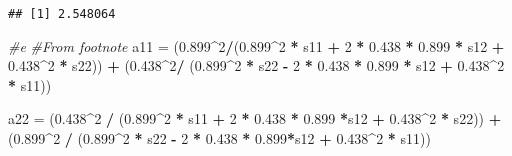 \documentclass[
]{article}
\newenvironment{Shaded}{\begin{snugshade}}{\end{snugshade}}
\newcommand{\CommentTok}[1]{\textcolor[rgb]{0.56,0.35,0.01}{\textit{#1}}}
\newcommand{\DecValTok}[1]{\textcolor[rgb]{0.00,0.00,0.81}{#1}}
\newcommand{\FloatTok}[1]{\textcolor[rgb]{0.00,0.00,0.81}{#1}}
\newcommand{\NormalTok}[1]{#1}
\newcommand{\OperatorTok}[1]{\textcolor[rgb]{0.81,0.36,0.00}{\textbf{#1}}}
\newcommand{\StringTok}[1]{\textcolor[rgb]{0.31,0.60,0.02}{#1}}
\begin{document}
\begin{verbatim}
## [1] 2.548064
\end{verbatim}

\begin{Shaded}
\begin{Highlighting}[]
\CommentTok{#e}
\CommentTok{#From footnote}
\NormalTok{a11 =}\StringTok{ }\NormalTok{(}\FloatTok{0.899}\OperatorTok{^}\DecValTok{2}\OperatorTok{/}\NormalTok{(}\FloatTok{0.899}\OperatorTok{^}\DecValTok{2} \OperatorTok{*}\StringTok{ }\NormalTok{s11 }\OperatorTok{+}\StringTok{ }\DecValTok{2} \OperatorTok{*}\StringTok{ }\FloatTok{0.438} \OperatorTok{*}\StringTok{ }\FloatTok{0.899} \OperatorTok{*}\StringTok{ }\NormalTok{s12 }\OperatorTok{+}\StringTok{ }\FloatTok{0.438}\OperatorTok{^}\DecValTok{2} \OperatorTok{*}\StringTok{ }\NormalTok{s22)) }\OperatorTok{+}\StringTok{ }\NormalTok{(}\FloatTok{0.438}\OperatorTok{^}\DecValTok{2}\OperatorTok{/}\StringTok{ }\NormalTok{(}\FloatTok{0.899}\OperatorTok{^}\DecValTok{2} \OperatorTok{*}\StringTok{ }\NormalTok{s22 }\OperatorTok{-}\StringTok{ }\DecValTok{2} \OperatorTok{*}\StringTok{ }\FloatTok{0.438} \OperatorTok{*}\StringTok{ }\FloatTok{0.899} \OperatorTok{*}\StringTok{ }\NormalTok{s12 }\OperatorTok{+}\StringTok{ }\FloatTok{0.438}\OperatorTok{^}\DecValTok{2} \OperatorTok{*}\StringTok{ }\NormalTok{s11))}

\NormalTok{a22 =}\StringTok{ }\NormalTok{(}\FloatTok{0.438}\OperatorTok{^}\DecValTok{2} \OperatorTok{/}\StringTok{ }\NormalTok{(}\FloatTok{0.899}\OperatorTok{^}\DecValTok{2} \OperatorTok{*}\StringTok{ }\NormalTok{s11 }\OperatorTok{+}\StringTok{ }\DecValTok{2} \OperatorTok{*}\StringTok{ }\FloatTok{0.438} \OperatorTok{*}\StringTok{ }\FloatTok{0.899} \OperatorTok{*}\NormalTok{s12 }\OperatorTok{+}\StringTok{ }\FloatTok{0.438}\OperatorTok{^}\DecValTok{2} \OperatorTok{*}\StringTok{ }\NormalTok{s22)) }\OperatorTok{+}\StringTok{ }\NormalTok{(}\FloatTok{0.899}\OperatorTok{^}\DecValTok{2} \OperatorTok{/}\StringTok{ }\NormalTok{(}\FloatTok{0.899}\OperatorTok{^}\DecValTok{2} \OperatorTok{*}\StringTok{ }\NormalTok{s22 }\OperatorTok{-}\StringTok{ }\DecValTok{2} \OperatorTok{*}\StringTok{ }\FloatTok{0.438} \OperatorTok{*}\StringTok{ }\FloatTok{0.899}\OperatorTok{*}\NormalTok{s12 }\OperatorTok{+}\StringTok{ }\FloatTok{0.438}\OperatorTok{^}\DecValTok{2} \OperatorTok{*}\StringTok{ }\NormalTok{s11))}


\end{Highlighting}
\end{Shaded}
\end{document}
